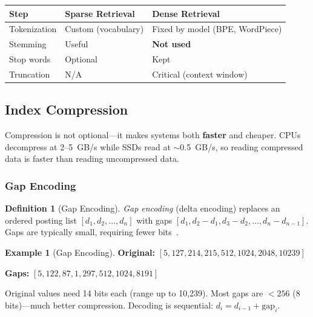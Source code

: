 \documentclass[11pt,a4paper]{article}
\theoremstyle{definition}
\newtheorem{definition}{Definition}[section]
\newtheorem{example}{Example}[section]
\theoremstyle{plain}
\begin{document}
\begin{center}
\begin{tabular}{lll}
\toprule
\textbf{Step} & \textbf{Sparse Retrieval} & \textbf{Dense Retrieval} \\
\midrule
Tokenization & Custom (vocabulary) & Fixed by model (BPE, WordPiece) \\
Stemming & Useful & \textbf{Not used} \\
Stop words & Optional & Kept \\
Truncation & N/A & Critical (context window) \\
\bottomrule
\end{tabular}
\end{center}

\begin{center}

\end{center}

\subsection{Index Compression}
\label{sec:compression}

Compression is not optional---it makes systems both \textbf{faster} and cheaper. CPUs decompress at 2--5~GB/s while SSDs read at $\sim$0.5~GB/s, so reading compressed data is faster than reading uncompressed data.

\subsubsection{Gap Encoding}

\begin{definition}[Gap Encoding]
\emph{Gap encoding} (delta encoding) replaces an ordered posting list $[d_1, d_2, \ldots, d_n]$ with gaps $[d_1, d_2 - d_1, d_3 - d_2, \ldots, d_n - d_{n-1}]$. Gaps are typically small, requiring fewer bits~\cite{manning2008introduction}.
\end{definition}

\begin{example}[Gap Encoding]
\textbf{Original:} $[5, 127, 214, 215, 512, 1024, 2048, 10239]$

\textbf{Gaps:} $[5, 122, 87, 1, 297, 512, 1024, 8191]$

Original values need 14 bits each (range up to 10,239). Most gaps are $<256$ (8 bits)---much better compression. Decoding is sequential: $d_i = d_{i-1} + \mathrm{gap}_i$.
\end{example}
\end{document}

